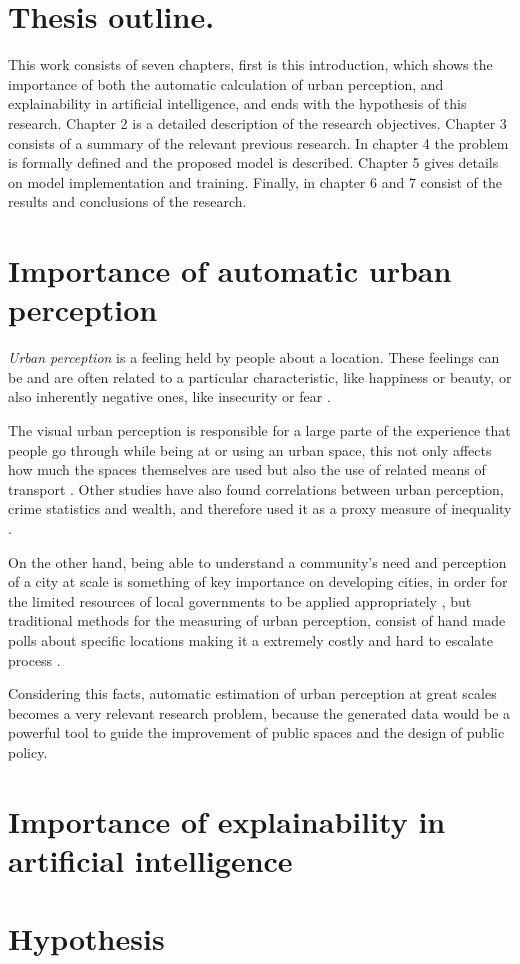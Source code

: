 \section{Thesis outline.}
This work consists of seven chapters, first is this introduction, which
shows the  importance of both the automatic calculation of urban perception, and
explainability in artificial intelligence, and ends with the hypothesis
of this research. Chapter 2 is a detailed description of the research objectives.
Chapter 3 consists of a summary of the relevant previous research. In chapter 4
the problem is formally defined and the proposed model is described. Chapter 5 gives
details on model implementation and training. Finally, in chapter 6 and 7 consist of the results and
conclusions of the research.

\section{Importance of automatic urban perception}

\textit{Urban perception} is a feeling held by people about a location. These feelings can be and
are often related to a particular characteristic, like happiness or beauty, or also
inherently negative ones, like insecurity or fear \cite{tamara_judgments}.

The visual urban perception is  responsible for a large parte of the experience that people
go through while  being at or using an urban space, this not only affects how much the spaces
themselves are used \cite{khisty} but also the use of related means of transport \cite{antonakos}.
Other studies have also found correlations between urban perception, crime statistics \cite{tamara_judgments}
and wealth, and therefore used it as a proxy measure of inequality \cite{tamara_judgments,hidalgo_inequality, rossetti}.

On the other hand, being able to understand a community's need and perception of a city at scale is something
of key importance on developing cities, in order for the limited  resources of local governments to be applied
appropriately \cite{santani}, but traditional methods for the measuring of urban perception, consist of hand made polls
about specific locations making it a extremely costly and hard to escalate process \cite{clifton}.

Considering this facts, automatic estimation of urban perception at great scales becomes a very relevant
research problem, because the generated data would be a powerful tool to guide the improvement of
public spaces and the design of public policy.

\section{Importance of explainability in artificial intelligence}

\section{Hypothesis}